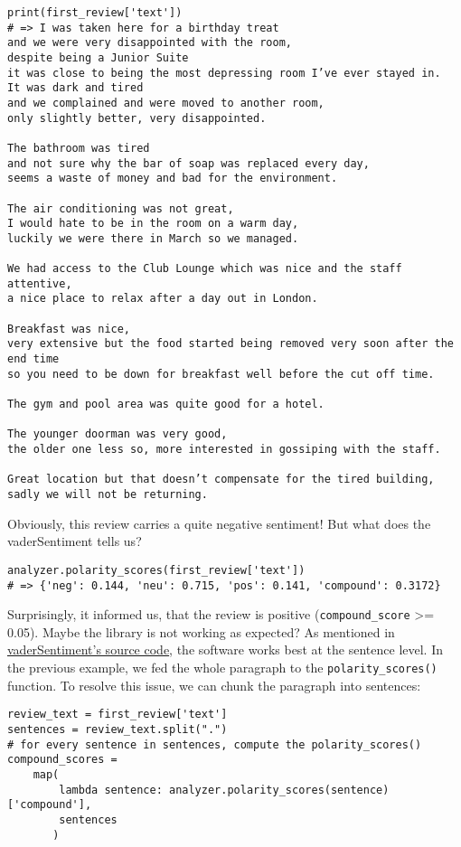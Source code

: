 	\begin{Verbatim}
print(first_review['text'])
# => I was taken here for a birthday treat 
and we were very disappointed with the room, 
despite being a Junior Suite 
it was close to being the most depressing room I’ve ever stayed in. 
It was dark and tired 
and we complained and were moved to another room, 
only slightly better, very disappointed. 

The bathroom was tired 
and not sure why the bar of soap was replaced every day, 
seems a waste of money and bad for the environment. 

The air conditioning was not great, 
I would hate to be in the room on a warm day, 
luckily we were there in March so we managed. 

We had access to the Club Lounge which was nice and the staff attentive, 
a nice place to relax after a day out in London. 

Breakfast was nice, 
very extensive but the food started being removed very soon after the end time 
so you need to be down for breakfast well before the cut off time. 

The gym and pool area was quite good for a hotel. 

The younger doorman was very good, 
the older one less so, more interested in gossiping with the staff. 

Great location but that doesn’t compensate for the tired building, 
sadly we will not be returning.
	\end{Verbatim}
	Obviously, this review carries a quite negative sentiment! But what does the vaderSentiment tells us?
	\begin{Verbatim}
analyzer.polarity_scores(first_review['text'])
# => {'neg': 0.144, 'neu': 0.715, 'pos': 0.141, 'compound': 0.3172}
	\end{Verbatim}
	Surprisingly, it informed us, that the review is positive (\verb|compound_score| >= 0.05). Maybe the library is not working as expected? As mentioned in \href{https://github.com/cjhutto/vaderSentiment/blob/master/vaderSentiment/vaderSentiment.py#L600}{vaderSentiment's source code}, the software works best at the sentence level. In the previous example, we fed the whole paragraph to the \verb|polarity_scores()| function. To resolve this issue, we can chunk the paragraph into sentences:
	\begin{Verbatim}
review_text = first_review['text']
sentences = review_text.split(".")
# for every sentence in sentences, compute the polarity_scores()
compound_scores = 
	map(
		lambda sentence: analyzer.polarity_scores(sentence)['compound'], 
		sentences
	   )
	\end{Verbatim}
